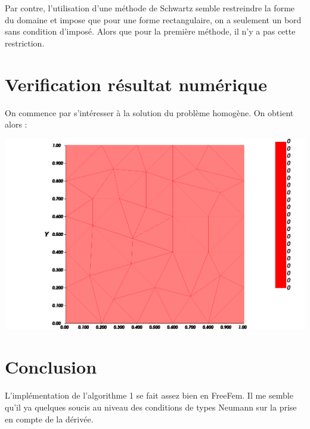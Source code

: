 Par contre, l'utilisation d'une méthode de Schwartz semble restreindre la forme du domaine et impose que pour une
forme rectangulaire, on a seulement un bord sans condition d'imposé.
Alors que pour la première méthode, il n'y a pas cette restriction.


\section{Verification résultat numérique}\label{sec:verification-résultat-numérique}

On commence par s'intéresser à la solution du problème homogène.
On obtient alors :

\includegraphics[scale=.5]{src/zero.png}

\section{Conclusion}\label{sec:conclusion}
L'implémentation de l'algorithme 1 se fait assez bien en FreeFem.
Il me semble qu'il ya quelques soucis au niveau des conditions de types Neumann sur la prise en compte de la dérivée.
